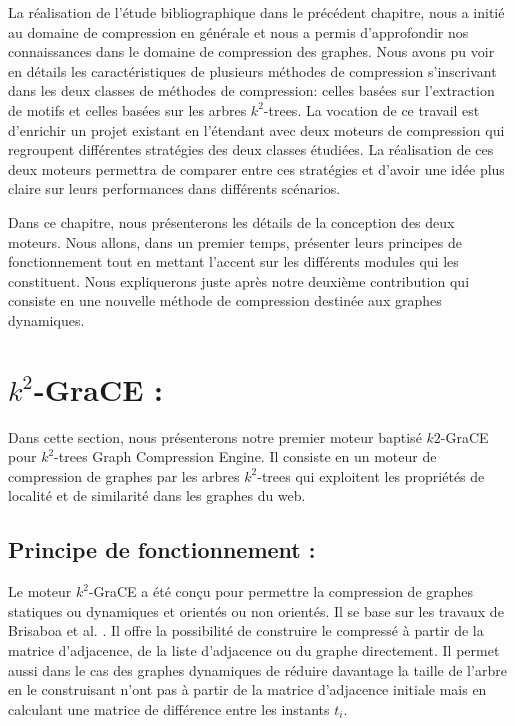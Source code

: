 \documentclass[a4paper,oneside,12pt]{report}
\theoremstyle{definition}
\begin{document}
	La réalisation de l'étude bibliographique dans le précédent chapitre, nous a initié au domaine de compression en générale et nous a permis d'approfondir nos connaissances dans le domaine de compression des graphes. Nous avons pu voir en détails les caractéristiques de plusieurs méthodes de compression s'inscrivant dans les deux classes de méthodes de compression: celles basées sur l'extraction de motifs et celles basées sur les arbres $k^2$-trees. La vocation de ce travail est d'enrichir un projet existant en l'étendant avec deux moteurs de compression qui regroupent différentes stratégies des deux classes étudiées. La réalisation de ces deux moteurs permettra de comparer entre ces stratégies et d'avoir une idée plus claire sur leurs performances dans différents scénarios.
	
	Dans ce chapitre, nous présenterons les détails de la conception des deux moteurs. Nous allons, dans un premier temps, présenter leurs principes de fonctionnement tout en mettant l'accent sur les différents modules qui les constituent. Nous expliquerons juste après notre deuxième contribution qui consiste en une nouvelle  méthode de compression destinée aux graphes dynamiques.
	

	\section{$k^2$-GraCE : }
	\label{k2}

Dans cette section, nous présenterons  notre premier moteur baptisé $k2$-GraCE pour $k^2$-trees Graph Compression Engine. Il consiste en un moteur de compression de graphes par les arbres $k^2$-trees qui exploitent les propriétés de localité et de similarité dans les graphes du web. 

		\subsection{Principe de fonctionnement :}
		
	Le moteur $k^2$-GraCE a été conçu pour permettre la compression de graphes statiques ou dynamiques et orientés ou non orientés. Il se base sur les travaux de Brisaboa et al. \citep{brisaboa2009k}. Il offre la possibilité de construire le compressé à partir de la matrice d'adjacence, de la liste d'adjacence ou du graphe directement. Il permet aussi dans le cas des graphes dynamiques de réduire davantage la taille de l'arbre en le construisant n'ont pas à partir de la matrice d'adjacence initiale mais en calculant une matrice de différence entre les instants $t_i$. 
	
\end{document}
